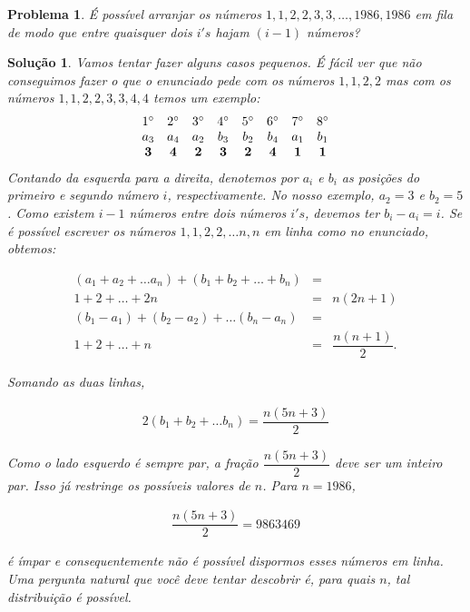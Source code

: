 \documentclass{hipatia}
\newtheorem{problem*}{Problema}
\newtheorem*{solution*}{Solução}
\begin{document}
\begin{problem*}
É possível arranjar os números $1,1,2,2,3,3, \ldots, 1986,1986$ em fila de modo que
entre quaisquer dois $i's$ hajam $(i-1)$ números? 
\end{problem*}


\begin{solution*}
Vamos tentar fazer alguns casos pequenos. É fácil ver que não conseguimos fazer o que o enunciado pede com os números $1,1,2,2$ mas com os números $1,1,2,2,3,3,4,4$ temos um exemplo:
$$
\begin{array}{cccccccc}
1^{\circ} & 2^{\circ} & 3^{\circ} & 4^{\circ} & 5^{\circ} & 6^{\circ} & 7^{\circ} & 8^{\circ} \\
a_3 & a_4 & a_2 & b_3 & b_2 & b_4 & a_1 & b_1 \\
{\bf 3}   & {\bf 4}   &  {\bf 2}  & {\bf 3}   & {\bf 2}   &  {\bf 4}  & {\bf 1}   & {\bf 1}
\end{array}
$$
Contando da esquerda para a direita, denotemos por $a_i$ e $b_i$ as posições do primeiro e segundo número $i$, respectivamente. No nosso exemplo, $a_2 = 3$ e $b_2 =5$. Como existem $i-1$ números entre dois números $i's$, devemos ter $b_i-a_i = i$. Se é possível escrever os números $1,1,2,2, \ldots n,n$ em linha como no enunciado, obtemos:

\begin{eqnarray*}
(a_1+a_2+ \ldots a_n) + (b_1+b_2+ \ldots + b_n)  & = &  \\
1 + 2 + \ldots + 2n  & = & n(2n+1)\\
(b_1 - a_1) + (b_2-a_2)+ \ldots (b_n-a_n) & = &  \\
1 + 2 + \ldots  + n & = & \dfrac{n(n+1)}{2}.
\end{eqnarray*} 

\noindent Somando as duas linhas,

\begin{eqnarray*}
2(b_1+b_2+ \ldots b_n) = \dfrac{n(5n+3)}{2}
\end{eqnarray*}

\noindent Como o lado esquerdo é sempre par, a fração $\dfrac{n(5n+3)}{2}$ deve ser um inteiro par. Isso já restringe os possíveis valores de $n$. Para $n=1986$,

\begin{eqnarray*}
\dfrac{n(5n+3)}{2} = 9863469
\end{eqnarray*}

\noindent é ímpar e consequentemente não é possível dispormos esses números em linha. Uma pergunta natural que você deve tentar descobrir é, para quais $n$, tal distribuição é possível. 
\end{solution*}
\end{document}
